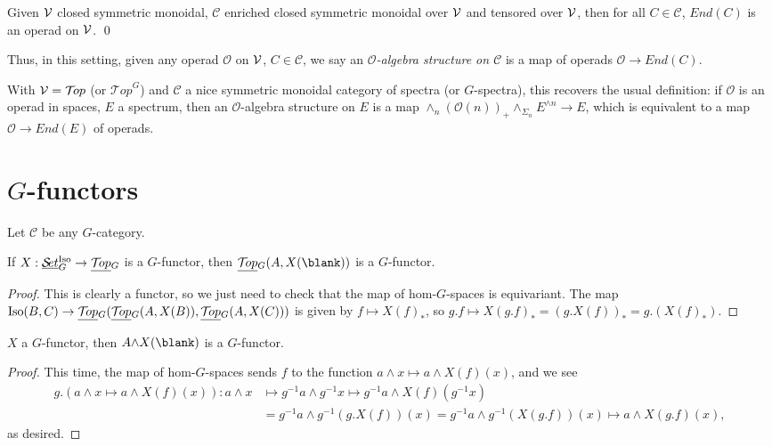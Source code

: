 \documentclass{report}
\newcommand{\Top}{\text{$\mathcal{T}\!op$}}
\newcommand{\Set}{\text{$\mathcal{S}\!et$}}
\DeclareMathOperator{\Iso}{Iso}
\newcommand{\TopG}{\text{\underline{$\Top$}$_G$}}
\newcommand{\SetG}{\text{\underline{$\Set$}$_G^{\mbox{\scriptsize Iso}}$}}
\renewcommand{\C}{\text{$\mathcal{C}$}}
\renewcommand{\smash}{\text{$\land$}}
\renewcommand{\O}{\text{$\mathcal{O}$}}
\begin{document}
\begin{appendices}
\begin{theorem}
  Given $\text{$\mathcal{V}$}$ closed symmetric monoidal, $\C$ enriched closed symmetric monoidal over $\text{$\mathcal{V}$}$ and tensored over $\text{$\mathcal{V}$}$, then for all $C\in\C$, $End(C)$ is an operad on $\text{$\mathcal{V}$}$. \qed
\end{theorem}

Thus, in this setting, given any operad $\O$ on $\text{$\mathcal{V}$}$, $C\in \C$, we say an {\em $\O$-algebra structure on $\C$} is a map of operads $\O\to End(C)$. 
 
\begin{example}
  With $\V = \Top$ (or $\Top^G$) and $\C$ a nice symmetric monoidal category of spectra (or $G$-spectra), this recovers the usual definition: if $\O$ is an operad in spaces, $E$ a spectrum, then an $\O$-algebra structure on $E$ is a map $\wedge_n(\O(n))_+\smash_{\Sigma_n}E^{\smash n}\to E$, which is equivalent to a map $\O \to End(E)$ of operads.
\end{example}




\section{$G$-functors}
Let $\C$ be any $G$-category.
\begin{lemma}
 If $X: \SetG\to \TopG$ is a $G$-functor, then $\TopG(A,X(\blank))$ is a $G$-functor.
\end{lemma}
\begin{proof}
This is clearly a functor, so we just need to check that the map of hom-$G$-spaces is equivariant. The map $\Iso(B,C)\to \TopG(\TopG(A,X(B)),\TopG(A,X(C)))$ is given by $f\mapsto X(f)_*$, so $g.f\mapsto X(g.f)_* = (g.X(f))_* = g.(X(f)_*)$.
\end{proof}

\begin{lemma}
  $X$ a $G$-functor, then $A\smash X(\blank)$ is a $G$-functor.
\end{lemma}
\begin{proof}
  This time, the map of hom-$G$-spaces sends $f$ to the function $a\smash x\mapsto a\smash X(f)(x)$, and we see
\begin{align*}
  g.(a\smash x\mapsto a\smash X(f)(x)):a\smash x &\mapsto g^{-1}a\smash g^{-1}x \mapsto g^{-1}a\smash X(f)(g^{-1}x)\\&=g^{-1}a\smash g^{-1}(g.X(f))(x) = g^{-1}a\smash g^{-1}(X(g.f))(x)\mapsto a\smash X(g.f)(x),
\end{align*}
as desired.
\end{proof}






\end{appendices}






\end{document}
